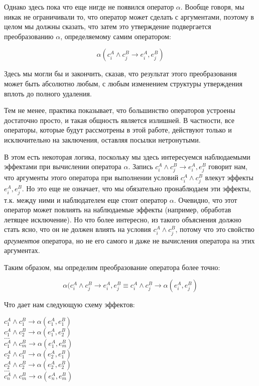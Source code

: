 Однако здесь пока что еще нигде не появился оператор $\alpha$. Вообще говоря, мы никак не ограничивали то, что оператор может сделать с аргументами, поэтому в целом мы должны сказать, что затем это утверждение подвергается преобразованию $\alpha$, определяемому самим оператором:

$$ \alpha(c^A_i \land c^B_j \rightarrow e^A_i, e^B_j) $$ 

Здесь мы могли бы и закончить, сказав, что результат этого преобразования может быть абсолютно любым, с любым изменением структуры утверждения вплоть до полного удаления.

Тем не менее, практика показывает, что большинство операторов устроены достаточно просто, и такая общность является излишней. В частности, все операторы, которые будут рассмотрены в этой работе, действуют только и исключительно на заключения, оставляя посылки нетронутыми.

В этом есть некоторая логика, поскольку мы здесь интересуемся наблюдаемыми эффектами при вычислении оператора $\alpha$. Запись $c^A_i \land c^B_j \rightarrow e^A_i, e^B_j$ говорит нам, что аргументы этого оператора при выполнении условий $c^A_i \land c^B_j$ влекут эффекты $e^A_i, e^B_j$. Но это еще не означает, что мы обязательно пронаблюдаем эти эффекты, т.к. между ними и наблюдателем еще стоит оператор $\alpha$. Очевидно, что этот оператор может повлиять на наблюдаемые эффекты (например, обработав летящее исключение). Но что более интересно, из такого объяснения должно стать ясно, что он не должен влиять на условия $c^A_i \land c^B_j$, потому что это свойство \emph{аргументов} оператора, но не его самого и даже не вычисления оператора на этих аргументах.

Таким образом, мы определим преобразование оператора более точно:

$$ \alpha(c^A_i \land c^B_j \rightarrow e^A_i, e^B_j \equiv c^A_i \land c^B_j \rightarrow \alpha(e^A_i, e^B_j) $$

Что дает нам  следующую схему эффектов:

{
    $c^A_1 \land c^B_1 \rightarrow \alpha(e^A_1, e^B_1)$ \\
    $c^A_1 \land c^B_2 \rightarrow \alpha(e^A_1, e^B_2)$ \\
    $\ldots$ \\
    $c^A_1 \land c^B_m \rightarrow \alpha(e^A_1, e^B_m)$ \\
    $c^A_2 \land c^B_1 \rightarrow \alpha(e^A_2, e^B_1)$ \\
    $c^A_2 \land c^B_2 \rightarrow \alpha(e^A_2, e^B_2)$ \\
    $\ldots$ \\
    $c^A_n \land c^B_m \rightarrow \alpha(e^A_n, e^B_m)$ \\
}{}

